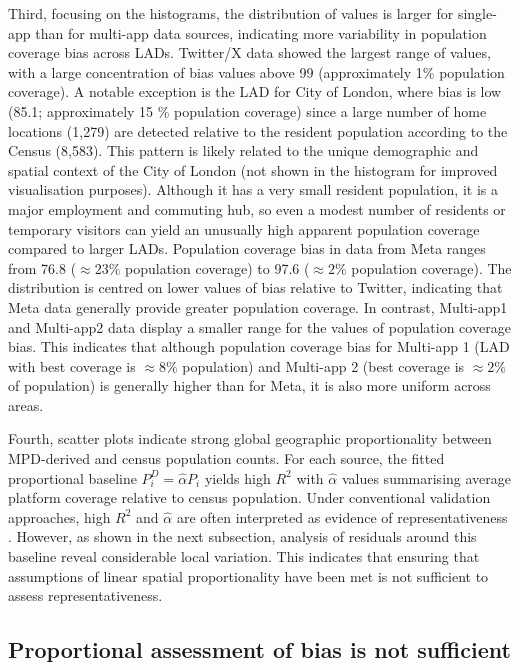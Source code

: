 \documentclass[]{rsos}%
\begin{document}
Third, focusing on the histograms, the distribution of values is larger
for single-app than for multi-app data sources, indicating more
variability in population coverage bias across LADs. Twitter/X data
showed the largest range of values, with a large concentration of bias
values above 99 (approximately 1\% population coverage). A notable
exception is the LAD for City of London, where bias is low (85.1;
approximately 15 \% population coverage) since a large number of home
locations (1,279) are detected relative to the resident population
according to the Census (8,583). This pattern is likely related to the
unique demographic and spatial context of the City of London (not shown
in the histogram for improved visualisation purposes). Although it has a
very small resident population, it is a major employment and commuting
hub, so even a modest number of residents or temporary visitors can
yield an unusually high apparent population coverage compared to larger
LADs. Population coverage bias in data from Meta ranges from 76.8
(\(\approx 23 \%\) population coverage) to 97.6 (\(\approx 2 \%\) population
coverage). The distribution is centred on lower values of bias relative
to Twitter, indicating that Meta data generally provide greater
population coverage. In contrast, Multi-app1 and Multi-app2 data display
a smaller range for the values of population coverage bias. This
indicates that although population coverage bias for Multi-app 1 (LAD
with best coverage is \(\approx 8 \%\) population) and Multi-app 2 (best
coverage is \(\approx 2\%\) of population) is generally higher than for
Meta, it is also more uniform across areas.

Fourth, scatter plots indicate strong global geographic proportionality
between MPD-derived and census population counts. For each source, the
fitted proportional baseline \(P_i^D = \hat{\alpha}P_i\) yields high \(R^2\)
with \(\hat{\alpha}\) values summarising average platform coverage
relative to census population. Under conventional validation approaches,
high \(R^2\) and \(\hat{\alpha}\) are often interpreted as evidence of
representativeness \citep{iradukunda2025estimating, renninger2026}. However,
as shown in the next subsection, analysis of residuals around this
baseline reveal considerable local variation. This indicates that
ensuring that assumptions of linear spatial proportionality have been
met is not sufficient to assess representativeness.

\subsection{Proportional assessment of bias is not sufficient}\label{proportional-assessment-of-bias-is-not-sufficient}
\end{document}
